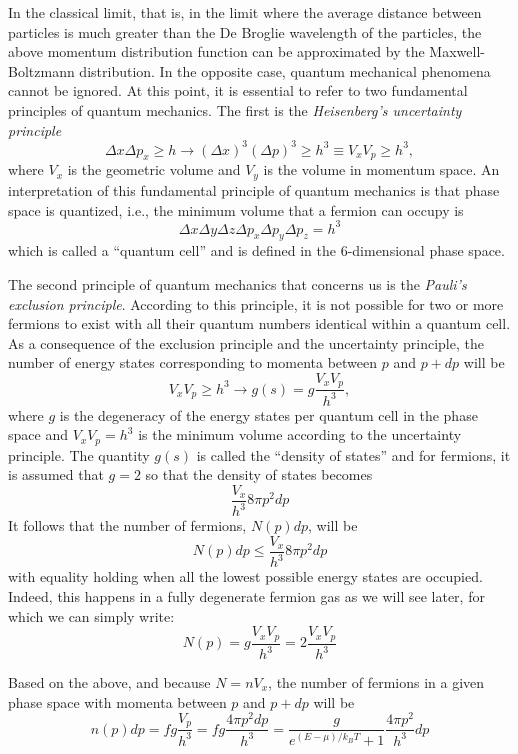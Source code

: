 \documentclass[main.tex]{subfiles}
\begin{document}
In the classical limit, that is, in the limit where the average distance between particles is much greater than the De Broglie wavelength of the particles, the above momentum distribution function can be approximated by the Maxwell-Boltzmann distribution. In the opposite case, quantum mechanical phenomena cannot be ignored. At this point, it is essential to refer to two fundamental principles of quantum mechanics. The first is the \textit{Heisenberg's uncertainty principle}
\begin{equation}
\Delta x \Delta p_x \geq h \longrightarrow (\Delta x)^3 (\Delta p)^3 \geq h^3 \equiv V_x V_p \geq h^3,
\end{equation}
where $V_x$ is the geometric volume and $V_y$ is the volume in momentum space. An interpretation of this fundamental principle of quantum mechanics is that phase space is quantized, i.e., the minimum volume that a fermion can occupy is
$$\Delta x \Delta y \Delta z \Delta p_x \Delta p_y \Delta p_z = h^3$$
which is called a ``quantum cell'' and is defined in the 6-dimensional phase space.

The second principle of quantum mechanics that concerns us is the \textit{Pauli's exclusion principle}. According to this principle, it is not possible for two or more fermions to exist with all their quantum numbers identical within a quantum cell. As a consequence of the exclusion principle and the uncertainty principle, the number of energy states corresponding to momenta between $p$ and $p + dp$ will be
$$V_x V_p \geq h^3 \longrightarrow g(s) = g\frac{V_x V_p}{h^3},$$
where $g$ is the degeneracy of the energy states per quantum cell in the phase space and $V_x V_p = h^3$ is the minimum volume according to the uncertainty principle. The quantity $g(s)$ is called the ``density of states'' and for fermions, it is assumed that $g=2$ so that the density of states becomes
$$ \frac{V_x}{h^3} 8 \pi p^2dp $$
It follows that the number of fermions, $N(p)dp$, will be
$$N(p)dp \leq \frac{V_x}{h^3} 8 \pi p^2dp $$
with equality holding when all the lowest possible energy states are occupied. Indeed, this happens in a fully degenerate fermion gas as we will see later, for which we can simply write:
$$N(p) = g \frac{V_x V_p}{h^3} = 2 \frac{V_x V_p}{h^3}$$

Based on the above, and because $N = n V_x$, the number of fermions in a given phase space with momenta between $p$ and $p + dp$ will be
\begin{equation}
    n(p) dp = f g \frac{V_p}{h^3} = f g \frac{4\pi p^2 dp}{h^3} = \frac{g}{e^{(E - \mu)/k_B T} + 1} \frac{4\pi p^2}{h^3} dp
\end{equation}
\end{document}
